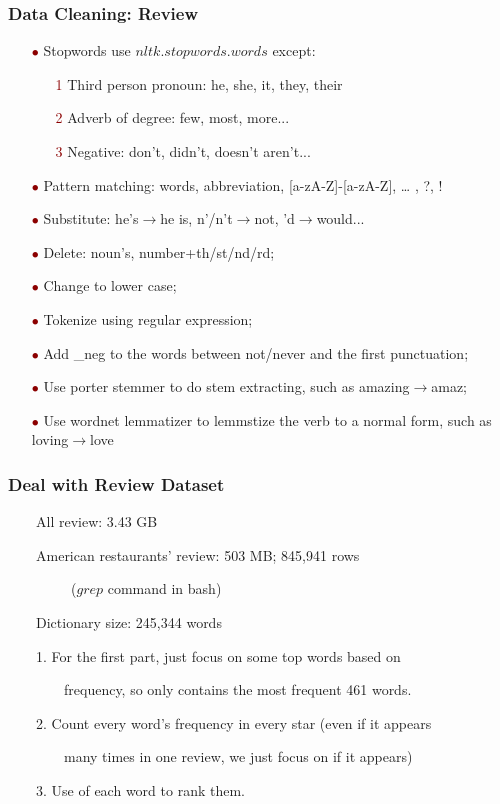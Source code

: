 \documentclass[notheorems, aspectratio=54]{beamer}
\renewcommand\textbullet{\ensuremath{\bullet}}
\begin{document}
\begin{frame}
\frametitle{Data Cleaning: Review}
\begin{itemize}
	\item[\textcolor{darkred}{\textbullet}] Stopwords use $nltk.stopwords.words$ except:
	\begin{itemize}
		\item[\textcolor{darkred}{1}] Third person pronoun: he, she, it, they, their
		\item[\textcolor{darkred}{2}] Adverb of degree: few, most, more...
		\item[\textcolor{darkred}{3}] Negative: don’t, didn’t, doesn’t aren’t...		
	\end{itemize}
    \item[\textcolor{darkred}{\textbullet}] Pattern matching: words, abbreviation, [a-zA-Z]-[a-zA-Z], … , ?, ! 
    \item[\textcolor{darkred}{\textbullet}] Substitute: he's$\rightarrow$he is, n'/n't$\rightarrow$not, 'd$\rightarrow$would...
    \item[\textcolor{darkred}{\textbullet}] Delete: noun’s, number+th/st/nd/rd;
    \item[\textcolor{darkred}{\textbullet}] Change to lower case;
    \item[\textcolor{darkred}{\textbullet}] Tokenize using regular expression;
    \item[\textcolor{darkred}{\textbullet}] Add \_neg to the words between not/never and the first punctuation;
    \item[\textcolor{darkred}{\textbullet}] Use porter stemmer to do stem extracting, such as amazing$\rightarrow$amaz;
    \item[\textcolor{darkred}{\textbullet}] Use wordnet lemmatizer to lemmstize the verb to a normal form, such as loving$\rightarrow$love
\end{itemize}
\end{frame}

\begin{frame}
\frametitle{Deal with Review Dataset}
\ \ \ \ All review: 3.43 GB

\ \ \ \ American restaurants' review: 503 MB; 845,941 rows 

\ \ \ \ \ \ \ \ \ ($grep$ command in bash)

\vspace{2ex}
\ \ \ \ Dictionary size: 245,344 words

\vspace{2ex}
\ \ \ \ 1. For the first part, just focus on some top words based on 

\ \ \ \ \ \ \ \  frequency, so only contains the most frequent 461 words.

\ \ \ \ 2. Count every word’s frequency in every star (even if it appears 

\ \ \ \ \ \ \ \ many times in one review, we just focus on if it appears)

\ \ \ \ 3. Use \color{darkred}{information gain} \color{black}of each word to rank them.

\end{frame}
\end{document}
